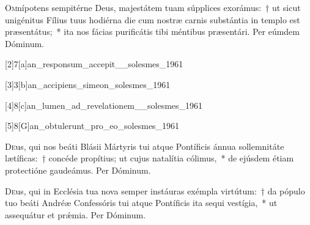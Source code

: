 \documentclass[vesperale_romanum.tex]{subfiles}
\begin{document}
\lettrine{O}{m}nípotens sempitérne Deus, majestátem tuam súpplices exorámus:~† ut sicut unigénitus Fílius tuus hodiérna die cum nostræ carnis substántia in templo est præsentátus;~* ita nos fácias purificátis tibi méntibus præsentári.
Per eúmdem Dóminum.



[2]{7}[a]{an_responsum_accepit__solesmes_1961} 

[3]{3}[b]{an_accipiens_simeon_solesmes_1961}

[4]{8}[c]{an_lumen_ad_revelationem__solesmes_1961}

[5]{8}[G]{an_obtulerunt_pro_eo_solesmes_1961}






\myrule



\oratio

\lettrine{D}{e}us, qui nos beáti Blásii Mártyris tui atque Pontíficis ánnua sollemnitáte lætíficas:~† concéde propítius; ut cujus natalítia cólimus,~* de ejúsdem étiam protectióne gaudeámus.
Per Dóminum.

\myrule


\duplexmtv

\oratio

\lettrine{D}{e}us, qui in Ecclésia tua nova semper instáuras exémpla virtútum:~† da pópulo tuo beáti Andréæ Confessóris tui atque Pontíficis ita sequi vestígia,~* ut assequátur et prǽmia. Per Dóminum.
\end{document}
